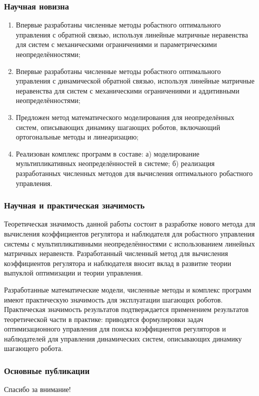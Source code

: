 \begin{frame}
    \frametitle{Научная новизна}
\begin{enumerate}
	\item Впервые разработаны численные методы робастного оптимального управления с обратной связью, используя линейные матричные неравенства для систем с механическими ограничениями и параметрическими неопределённостями;
	\item Впервые разработаны численные методы робастного оптимального управления с динамической обратной связью, используя линейные матричные неравенства для систем с механическими ограничениями и аддитивными неопределённостями;
	\item Предложен метод математического моделирования для неопределённых систем, описывающих динамику шагающих роботов, включающий ортогональные методы и линеаризацию;
	\item Реализован комплекс программ в составе: а) моделирование мультипликативных неопределённостей в системе; б) реализация разработанных численных методов для вычисления оптимального робастного управления.
\end{enumerate}
\end{frame}

\begin{frame}
    \frametitle{Научная и практическая значимость}
	Теоретическая значимость данной работы состоит в разработке нового метода для вычисления коэффициентов регулятора и наблюдателя для робастного управления системы с мультипликативными неопределённостями с использованием линейных матричных неравенств. Разработанный численный метод для вычисления коэффициентов регулятора и наблюдателя вносит вклад в развитие теории выпуклой оптимизации и теории управления.
	
	Разработанные математические модели, численные методы и комплекс программ имеют практическую значимость для эксплуатации шагающих роботов. Практическая значимость результатов подтверждается применением результатов теоретической части в практике: приводятся формулировки задач оптимизационного управления для поиска коэффициентов регуляторов и наблюдателей для управления динамических систем, описывающих динамику шагающего робота. 
\end{frame}

\begin{frame} %
    \frametitle{Основные публикации}
    \nocite{scbib1}%
 
    \nocite{bib1}%
\end{frame}

\begin{frame} %
    \begin{center}
        \Huge
        Спасибо за внимание!
    \end{center}
\end{frame}
